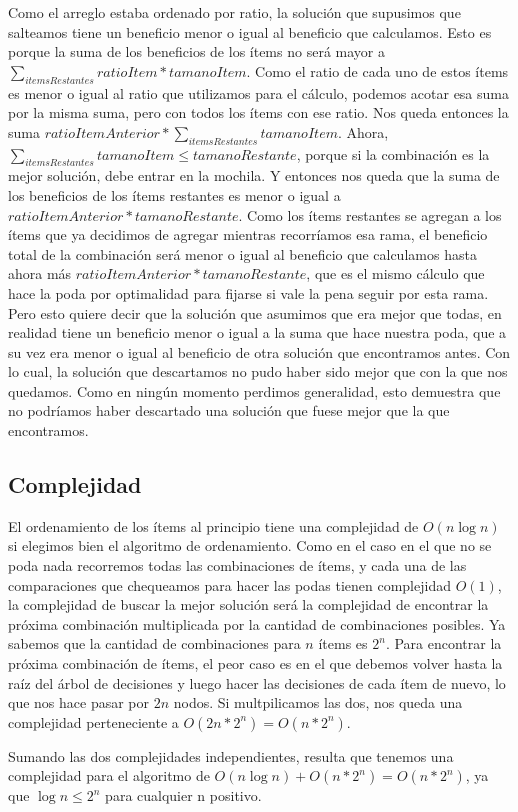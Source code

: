 \documentclass[10pt, a4paper]{article}
\begin{document}
Como el arreglo estaba ordenado por ratio, la solución que supusimos que salteamos tiene un beneficio menor o igual al beneficio que calculamos. Esto es porque la suma de los beneficios de los ítems no será mayor a $\sum_{itemsRestantes} ratioItem * tamanoItem$. Como el ratio de cada uno de estos ítems es menor o igual al ratio que utilizamos para el cálculo, podemos acotar esa suma por la misma suma, pero con todos los ítems con ese ratio. Nos queda entonces la suma $ratioItemAnterior * \sum_{itemsRestantes} tamanoItem$. Ahora, $\sum_{itemsRestantes} tamanoItem \leq tamanoRestante$, porque si la combinación es la mejor solución, debe entrar en la mochila. Y entonces nos queda que la suma de los beneficios de los ítems restantes es menor o igual a $ratioItemAnterior * tamanoRestante$. Como los ítems restantes se agregan a los ítems que ya decidimos de agregar mientras recorríamos esa rama, el beneficio total de la combinación será menor o igual al beneficio que calculamos hasta ahora más $ratioItemAnterior * tamanoRestante$, que es el mismo cálculo que hace la poda por optimalidad para fijarse si vale la pena seguir por esta rama. Pero esto quiere decir que la solución que asumimos que era mejor que todas, en realidad tiene un beneficio menor o igual a la suma que hace nuestra poda, que a su vez era menor o igual al beneficio de otra solución que encontramos antes. Con lo cual, la solución que descartamos no pudo haber sido mejor que con la que nos quedamos. Como en ningún momento perdimos generalidad, esto demuestra que no podríamos haber descartado una solución que fuese mejor que la que encontramos.\par

\subsection{Complejidad}
El ordenamiento de los ítems al principio tiene una complejidad de $O(n \log{} n)$ si elegimos bien el algoritmo de ordenamiento. Como en el caso en el que no se poda nada recorremos todas las combinaciones de ítems, y cada una de las comparaciones que chequeamos para hacer las podas tienen complejidad $O(1)$, la complejidad de buscar la mejor solución será la complejidad de encontrar la próxima combinación multiplicada por la cantidad de combinaciones posibles. Ya sabemos que la cantidad de combinaciones para $n$ ítems es $2^n$. Para encontrar la próxima combinación de ítems, el peor caso es en el que debemos volver hasta la raíz del árbol de decisiones y luego hacer las decisiones de cada ítem de nuevo, lo que nos hace pasar por $2n$ nodos. Si multpilicamos las dos, nos queda una complejidad perteneciente a $O(2n * 2^n) = O(n * 2^n)$.\par
Sumando las dos complejidades independientes, resulta que tenemos una complejidad para el algoritmo de $O(n \log{} n) + O(n * 2^n) = O(n * 2^n)$, ya que $\log{} n \leq 2^n$ para cualquier n positivo.
\end{document}

